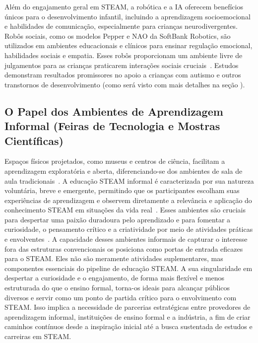\documentclass[%
  a4paper,%
  12pt,%
  fleqn,%
  english,%
  brazilian,%
]{article}
\begin{document}
Além do engajamento geral em STEAM, a robótica e a IA oferecem benefícios únicos para o desenvolvimento infantil, incluindo a aprendizagem socioemocional e habilidades de comunicação, especialmente para crianças neurodivergentes. Robôs sociais, como os modelos Pepper e NAO da SoftBank Robotics, são utilizados em ambientes educacionais e clínicos para ensinar regulação emocional, habilidades sociais e empatia. Esses robôs proporcionam um ambiente livre de julgamentos para as crianças praticarem interações sociais cruciais~\cite{behavioralHealthRoboticsAI2025}. Estudos demonstram resultados promissores no apoio a crianças com autismo e outros transtornos de desenvolvimento (como será visto com mais detalhes na seção ). %

\subsection{O Papel dos Ambientes de Aprendizagem Informal (Feiras de Tecnologia e Mostras Científicas)}

Espaços físicos projetados, como museus e centros de ciência, facilitam a aprendizagem exploratória e aberta, diferenciando-se dos ambientes de sala de aula tradicionais~\cite{ross2024BeyondExhibits}. A educação STEAM informal é caracterizada por sua natureza voluntária, breve e emergente, permitindo que os participantes escolham suas experiências de aprendizagem e observem diretamente a relevância e aplicação do conhecimento STEAM em situações da vida real~\cite{cheung2024SummerLibraries}. Esses ambientes são cruciais para despertar uma paixão duradoura pelo aprendizado e para fomentar a curiosidade, o pensamento crítico e a criatividade por meio de atividades práticas e envolventes~\cite{meegleYouthRobotics2025}.
A capacidade desses ambientes informais de capturar o interesse fora das estruturas convencionais os posiciona como portas de entrada eficazes para o STEAM. Eles não são meramente atividades suplementares, mas componentes essenciais do pipeline de educação STEAM. A sua singularidade em despertar a curiosidade e o engajamento, de forma mais flexível e menos estruturada do que o ensino formal, torna-os ideais para alcançar públicos diversos e servir como um ponto de partida crítico para o envolvimento com STEAM. Isso implica a necessidade de parcerias estratégicas entre provedores de aprendizagem informal, instituições de ensino formal e a indústria, a fim de criar caminhos contínuos desde a inspiração inicial até a busca sustentada de estudos e carreiras em STEAM.
\end{document}
